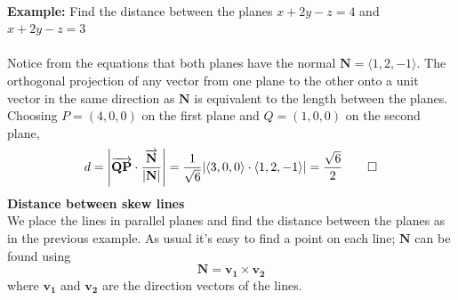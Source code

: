 \documentclass{report}
\begin{document}
\vspace{1mm}\\
\textbf{Example:} Find the distance between the planes
$x+2y-z=4$ and $x+2y-z=3$\\
\vspace{1mm}\\
Notice from the equations that both planes have the normal $\mathbf{N}=\langle 1,2,-1\rangle$. 
The orthogonal projection of any vector from one plane to the other onto 
a unit vector in the same direction as $\mathbf{N}$ is equivalent to the length between
the planes. Choosing $P=(4,0,0)$ on the first plane and $Q=(1,0,0)$ on the second plane,
\begin{equation*}
d=\left|\overrightarrow{\mathbf{QP}}\cdot
\frac{\overrightarrow{\mathbf{N}}}{|\mathbf{N}|}\right|
=\frac{1}{\sqrt{6}}|\langle 3,0,0\rangle\cdot\langle 1,2,-1\rangle|=\frac{\sqrt{6}}{2}\qed
\end{equation*}
\textbf{Distance between skew lines}\\
We place the lines in parallel planes and find the distance between the planes as in the 
previous example. As usual it's easy to find a point on each line; $\mathbf{N}$ can be found using
\begin{equation*}
\mathbf{N=v_1\times v_2}
\end{equation*}
where $\mathbf{v_1}$ and $\mathbf{v_2}$ are the direction vectors of the lines.
\newpage
\end{document}
